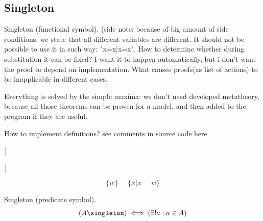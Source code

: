 \subsection{Singleton}
\begin{definition} Singleton (functional symbol).
(side note: because of big amount of side conditions, we state that all different variables are different. 
It should not be possible to use it in such way: "{x}={x|x=x}".
How to determine whether during substitution it can be fixed?
I want it to happen automatically, but i don't want the proof to depend on implementation.
What causes proofs(as list of actions) to be inapplicable in different cases.

Everything is solved by the simple maxima: we don't need developed metatheory, because all those theorems can be proven for a model, and then added to the program if they are useful.

How to implement definitions? see comments in source code here





)

)



\[
\{w\} = \{x|x=w\}
\]
\end{definition}

\begin{definition} Singleton (predicate symbol).
\[
(A\singleton) \iff (\exists!a:a\in A)
\]
\end{definition}
